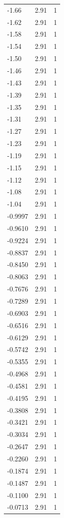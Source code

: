 \begin{longtable}{lrr}
  -1.66 & 2.91 & 1 \\
  -1.62 & 2.91 & 1 \\
  -1.58 & 2.91 & 1 \\
  -1.54 & 2.91 & 1 \\
  -1.50 & 2.91 & 1 \\
  -1.46 & 2.91 & 1 \\
  -1.43 & 2.91 & 1 \\
  -1.39 & 2.91 & 1 \\
  -1.35 & 2.91 & 1 \\
  -1.31 & 2.91 & 1 \\
  -1.27 & 2.91 & 1 \\
  -1.23 & 2.91 & 1 \\
  -1.19 & 2.91 & 1 \\
  -1.15 & 2.91 & 1 \\
  -1.12 & 2.91 & 1 \\
  -1.08 & 2.91 & 1 \\
  -1.04 & 2.91 & 1 \\
  -0.9997 & 2.91 & 1 \\
  -0.9610 & 2.91 & 1 \\
  -0.9224 & 2.91 & 1 \\
  -0.8837 & 2.91 & 1 \\
  -0.8450 & 2.91 & 1 \\
  -0.8063 & 2.91 & 1 \\
  -0.7676 & 2.91 & 1 \\
  -0.7289 & 2.91 & 1 \\
  -0.6903 & 2.91 & 1 \\
  -0.6516 & 2.91 & 1 \\
  -0.6129 & 2.91 & 1 \\
  -0.5742 & 2.91 & 1 \\
  -0.5355 & 2.91 & 1 \\
  -0.4968 & 2.91 & 1 \\
  -0.4581 & 2.91 & 1 \\
  -0.4195 & 2.91 & 1 \\
  -0.3808 & 2.91 & 1 \\
  -0.3421 & 2.91 & 1 \\
  -0.3034 & 2.91 & 1 \\
  -0.2647 & 2.91 & 1 \\
  -0.2260 & 2.91 & 1 \\
  -0.1874 & 2.91 & 1 \\
  -0.1487 & 2.91 & 1 \\
  -0.1100 & 2.91 & 1 \\
  -0.0713 & 2.91 & 1 \\

\end{longtable}
